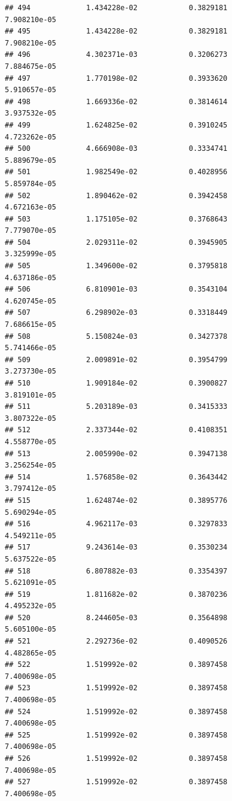 \documentclass[
]{article}
\begin{document}
\begin{verbatim}
## 494             1.434228e-02            0.3829181            7.908210e-05
## 495             1.434228e-02            0.3829181            7.908210e-05
## 496             4.302371e-03            0.3206273            7.884675e-05
## 497             1.770198e-02            0.3933620            5.910657e-05
## 498             1.669336e-02            0.3814614            3.937532e-05
## 499             1.624825e-02            0.3910245            4.723262e-05
## 500             4.666908e-03            0.3334741            5.889679e-05
## 501             1.982549e-02            0.4028956            5.859784e-05
## 502             1.890462e-02            0.3942458            4.672163e-05
## 503             1.175105e-02            0.3768643            7.779070e-05
## 504             2.029311e-02            0.3945905            3.325999e-05
## 505             1.349600e-02            0.3795818            4.637186e-05
## 506             6.810901e-03            0.3543104            4.620745e-05
## 507             6.298902e-03            0.3318449            7.686615e-05
## 508             5.150824e-03            0.3427378            5.741466e-05
## 509             2.009891e-02            0.3954799            3.273730e-05
## 510             1.909184e-02            0.3900827            3.819101e-05
## 511             5.203189e-03            0.3415333            3.807322e-05
## 512             2.337344e-02            0.4108351            4.558770e-05
## 513             2.005990e-02            0.3947138            3.256254e-05
## 514             1.576858e-02            0.3643442            3.797412e-05
## 515             1.624874e-02            0.3895776            5.690294e-05
## 516             4.962117e-03            0.3297833            4.549211e-05
## 517             9.243614e-03            0.3530234            5.637522e-05
## 518             6.807882e-03            0.3354397            5.621091e-05
## 519             1.811682e-02            0.3870236            4.495232e-05
## 520             8.244605e-03            0.3564898            5.605100e-05
## 521             2.292736e-02            0.4090526            4.482865e-05
## 522             1.519992e-02            0.3897458            7.400698e-05
## 523             1.519992e-02            0.3897458            7.400698e-05
## 524             1.519992e-02            0.3897458            7.400698e-05
## 525             1.519992e-02            0.3897458            7.400698e-05
## 526             1.519992e-02            0.3897458            7.400698e-05
## 527             1.519992e-02            0.3897458            7.400698e-05

\end{verbatim}
\end{document}
